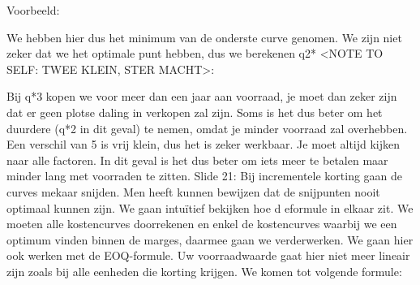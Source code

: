 \documentclass[10pt,a4paper]{report}
\begin{document}








Voorbeeld:














We hebben hier dus het minimum van de onderste curve genomen.
We zijn niet zeker dat we het optimale punt hebben, dus we berekenen q2* <NOTE TO SELF: TWEE KLEIN, STER MACHT>:











Bij q*3 kopen we voor meer dan een jaar aan voorraad, je moet dan zeker zijn dat er geen plotse daling in verkopen zal zijn. Soms is het dus beter om het duurdere (q*2 in dit geval) te nemen, omdat je minder voorraad zal overhebben. Een verschil van 5 is vrij klein, dus het is zeker werkbaar. Je moet altijd kijken naar alle factoren. In dit geval is het dus beter om iets meer te betalen maar minder lang met voorraden te zitten.
Slide 21: Bij incrementele korting gaan de curves mekaar snijden. Men heeft kunnen bewijzen dat de snijpunten nooit optimaal kunnen zijn. We gaan intuïtief bekijken hoe d eformule in elkaar zit.
We moeten alle kostencurves doorrekenen en enkel de kostencurves waarbij we een optimum vinden binnen de marges, daarmee gaan we verderwerken. We gaan hier ook werken met de EOQ-formule.
Uw voorraadwaarde gaat hier niet meer lineair zijn zoals bij alle eenheden die korting krijgen.
We komen tot volgende formule:



\end{document}
